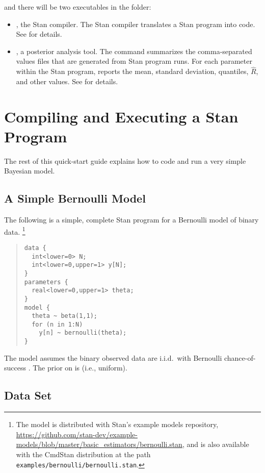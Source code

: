 %
and there will be two executables in the  folder:
%
\begin{itemize}
  \item {}, the Stan compiler. The Stan compiler
    translates a Stan program into \Cpp code. See 
    for details.
  \item {}, a posterior analysis tool. The 
    command summarizes the comma-separated values files that are
    generated from Stan program runs. For each parameter within the
    Stan program,  reports the mean, standard deviation,
    quantiles, $\hat{R}$, and other values. See  for
    details.
\end{itemize}

\section{Compiling and Executing a Stan Program}\label{compiling-model.section}

The rest of this quick-start guide explains how to code and run a very
simple Bayesian model.

\subsection{A Simple Bernoulli Model}

The following is a simple, complete Stan program for a Bernoulli model
of binary data.%
%
\footnote{The model is distributed with Stan's example models
  repository,
  \url{https://github.com/stan-dev/example-models/blob/master/basic_estimators/bernoulli.stan},
  and is also available with the CmdStan distribution at the path
  \nolinkurl{examples/bernoulli/bernoulli.stan}.  }
%
\begin{quote}
\begin{Verbatim}
data {
  int<lower=0> N;
  int<lower=0,upper=1> y[N];
}
parameters {
  real<lower=0,upper=1> theta;
}
model {
  theta ~ beta(1,1);
  for (n in 1:N)
    y[n] ~ bernoulli(theta);
}
\end{Verbatim}
\end{quote}
%
The model assumes the binary observed data 
are i.i.d.\ with Bernoulli chance-of-success .  The
prior on  is  (i.e., uniform).

\subsection{Data Set}

